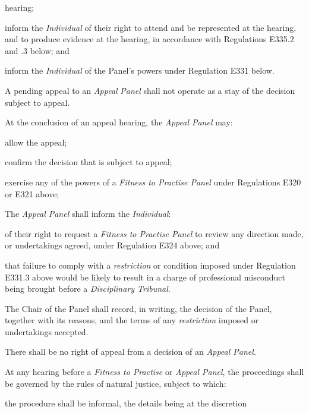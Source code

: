 hearing;\item inform the \emph{Individual } of their right to attend and be
represented at the hearing, and to produce evidence at the hearing, in
accordance with Regulations E335.2 and .3 below; and\item inform the \emph{Individual} of the Panel's powers under Regulation
E331 below.\ln
{}\par
A pending appeal to an \emph{Appeal} \emph{Panel} shall not operate as a
stay of the decision subject to appeal.\\
\par
{}
At the conclusion of an appeal hearing, the \emph{Appeal Panel} may:\\\nl \item allow the appeal;\item confirm the decision that is subject to appeal;\item exercise any of the powers of a \emph{Fitness to Practise
Panel} under Regulations E320 or E321 above;\ln
{}\par
The \emph{Appeal Panel} shall inform the \emph{Individual}:\\\nl \item of their right to request a \emph{Fitness to Practise Panel} to
review any direction made, or undertakings agreed, under Regulation E324
above; and\item that failure to comply with a \emph{restriction} or condition imposed
under Regulation E331.3 above would be likely to result in a charge of
professional misconduct being brought before a \emph{Disciplinary
Tribunal}.\ln
{}\par
The Chair of the Panel shall record, in writing, the decision of the
Panel, together with its reasons, and the terms of
any \emph{restriction} imposed or undertakings accepted.\\
\par
There shall be no right of appeal from a decision of an \emph{Appeal
Panel}.\\
\par
{}
At any hearing before a \emph{Fitness to
Practise} or \emph{Appeal Panel}, the proceedings shall be governed by
the rules of natural justice, subject to which:\\\nl \item the procedure shall be informal, the details being at the discretion
